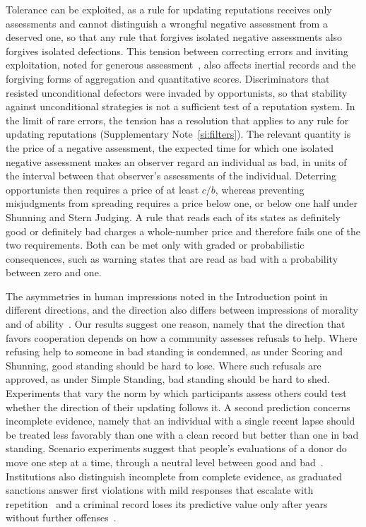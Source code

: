 \documentclass[10pt]{wlscirep}
\theoremstyle{plain}
\theoremstyle{remark}
\begin{document}
Tolerance can be exploited, as a rule for updating reputations receives only assessments and cannot distinguish a wrongful negative assessment from a deserved one, so that any rule that forgives isolated negative assessments also forgives isolated defections. This tension between correcting errors and inviting exploitation, noted for generous assessment~\cite{schmid2021}, also affects inertial records and the forgiving forms of aggregation and quantitative scores. Discriminators that resisted unconditional defectors were invaded by opportunists, so that stability against unconditional strategies is not a sufficient test of a reputation system. In the limit of rare errors, the tension has a resolution that applies to any rule for updating reputations (Supplementary Note~\ref{si:filters}). The relevant quantity is the price of a negative assessment, the expected time for which one isolated negative assessment makes an observer regard an individual as bad, in units of the interval between that observer's assessments of the individual. Deterring opportunists then requires a price of at least $c/b$, whereas preventing misjudgments from spreading requires a price below one, or below one half under Shunning and Stern Judging. A rule that reads each of its states as definitely good or definitely bad charges a whole-number price and therefore fails one of the two requirements. Both can be met only with graded or probabilistic consequences, such as warning states that are read as bad with a probability between zero and one.

The asymmetries in human impressions noted in the Introduction point in different directions, and the direction also differs between impressions of morality and of ability~\cite{reeder1979,skowronski1989,mendesiedlecki2013diagnostic}. Our results suggest one reason, namely that the direction that favors cooperation depends on how a community assesses refusals to help. Where refusing help to someone in bad standing is condemned, as under Scoring and Shunning, good standing should be hard to lose. Where such refusals are approved, as under Simple Standing, bad standing should be hard to shed. Experiments that vary the norm by which participants assess others could test whether the direction of their updating follows it. A second prediction concerns incomplete evidence, namely that an individual with a single recent lapse should be treated less favorably than one with a clean record but better than one in bad standing. Scenario experiments suggest that people's evaluations of a donor do move one step at a time, through a neutral level between good and bad~\cite{yamamoto2025}. Institutions also distinguish incomplete from complete evidence, as graduated sanctions answer first violations with mild responses that escalate with repetition~\cite{ostrom1990,cox2010} and a criminal record loses its predictive value only after years without further offenses~\cite{blumstein2009}.
\end{document}
